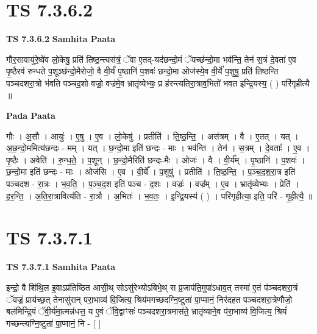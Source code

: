 \documentclass[17pt]{extarticle}
\begin{document}

\section{ TS 7.3.6.2 }

\textbf{TS 7.3.6.2 } \newline
\textbf{Samhita Paata} \newline

गौर॒सावायु॑रे॒ष्वे॑व लो॒केषु॒ प्रति॑ तिष्ठ॒न्त्यस॑त्रं॒ ॅवा ए॒तद्-यद॑छन्दो॒मं ॅयच्छ॑न्दो॒मा भव॑न्ति॒ तेन॑ स॒त्रं दे॒वता॑ ए॒व पृ॒ष्ठैरव॑ रुन्धते प॒शूञ्छ॑न्दो॒मैरोजो॒ वै वी॒र्यं॑ पृ॒ष्ठानि॑ प॒शवः॑ छन्दो॒मा ओज॑स्ये॒व वी॒र्ये॑ प॒शुषु॒ प्रति॑ तिष्ठन्ति पञ्चदशरा॒त्रो भ॑वति पञ्चद॒शो वज्रो॒ वज्र॑मे॒व भ्रातृ॑व्येभ्यः॒ प्र ह॑रन्त्यतिरा॒त्राव॒भितो॑ भवत इन्द्रि॒यस्य॒ ( ) परि॑गृहीत्यै ॥ \newline

\textbf{Pada Paata} \newline

गौः । अ॒सौ । आयुः॑ । ए॒षु । ए॒व । लो॒केषु॑ । प्रतीति॑ । ति॒ष्ठ॒न्ति॒ । अस॑त्रम् । वै । ए॒तत् । यत् । अ॒छ॒न्दो॒ममित्य॑छन्दः - मम् । यत् । छ॒न्दो॒मा इति॑ छन्दः - माः । भव॑न्ति । तेन॑ । स॒त्रम् । दे॒वताः᳚ । ए॒व । पृ॒ष्ठैः । अवेति॑ । रु॒न्ध॒ते॒ । प॒शून् । छ॒न्दो॒मैरिति॑ छन्दः-मैः । ओजः॑ । वै । वी॒र्य᳚म् । पृ॒ष्ठानि॑ । प॒शवः॑ । छ॒न्दो॒मा इति॑ छन्दः - माः । ओज॑सि । ए॒व । वी॒र्ये᳚ । प॒शुषु॑ । प्रतीति॑ । ति॒ष्ठ॒न्ति॒ । प॒ञ्च॒द॒श॒रा॒त्र इति॑ पञ्चदश - रा॒त्रः । भ॒व॒ति॒ । प॒ञ्च॒द॒श इति॑ पञ्च - द॒शः । वज्रः॑ । वज्र᳚म् । ए॒व । भ्रातृ॑व्येभ्यः । प्रेति॑ । ह॒र॒न्ति॒ । अ॒ति॒रा॒त्रावित्य॑ति - रा॒त्रौ । अ॒भितः॑ । भ॒व॒तः॒ । इ॒न्द्रि॒यस्य॑ ( ) । परि॑गृहीत्या॒ इति॒ परि॑ - गृ॒ही॒त्यै॒ ॥  \newline





\section{ TS 7.3.7.1 }

\textbf{TS 7.3.7.1 } \newline
\textbf{Samhita Paata} \newline

इन्द्रो॒ वै शि॑थि॒ल इ॒वाऽप्र॑तिष्ठित आसी॒थ् सोऽसु॑रेभ्योऽबिभे॒थ् स प्र॒जाप॑ति॒मुपा॑ऽधाव॒त् तस्मा॑ ए॒तं प॑ञ्चदशरा॒त्रं ॅवज्रं॒ प्राय॑च्छ॒त् तेनासु॑रान् परा॒भाव्य॑ वि॒जित्य॒ श्रिय॑मगच्छदग्नि॒ष्टुता॑ पा॒प्मानं॒ निर॑दहत पञ्चदशरा॒त्रेणौजो॒ बल॑मिन्द्रि॒यं ॅवी॒र्य॑मा॒त्मन्न॑धत्त॒ य ए॒वं ॅवि॒द्वाꣳसः॑ पञ्चदशरा॒त्रमास॑ते॒ भ्रातृ॑व्याने॒व प॑रा॒भाव्य॑ वि॒जित्य॒ श्रियं॑ गच्छन्त्यग्नि॒ष्टुता॑ पा॒प्मानं॒ नि - [  ] \newline
\end{document}

